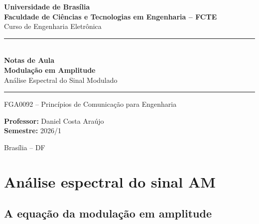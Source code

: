 \documentclass[11pt,a4paper]{article}
\begin{document}
\begin{titlepage}
\thispagestyle{empty}
\centering

\vspace*{1.5cm}

{\large\textbf{Universidade de Brasília}}\\[0.15cm]
{\large\textbf{Faculdade de Ciências e Tecnologias em Engenharia -- FCTE}}\\[0.15cm]
{\normalsize Curso de Engenharia Eletrônica}\\[1.8cm]

\rule{\textwidth}{1pt}\\[0.5cm]
{\Huge\textbf{Notas de Aula}}\\[0.5cm]
{\LARGE\textbf{Modulação em Amplitude}}\\[0.4cm]
{\large Análise Espectral do Sinal Modulado}\\[0.5cm]
\rule{\textwidth}{1pt}

\vspace{2.5cm}

{\large FGA0092 -- Princípios de Comunicação para Engenharia}

\vfill

\begin{flushleft}
\large
\textbf{Professor:} Daniel Costa Araújo\\[0.3cm]
\textbf{Semestre:} 2026/1
\end{flushleft}

\vspace{1cm}

{\large Brasília -- DF}

\end{titlepage}

\newpage
\tableofcontents
\newpage

\section{Análise espectral do sinal AM}

\subsection{A equação da modulação em amplitude}
\end{document}
